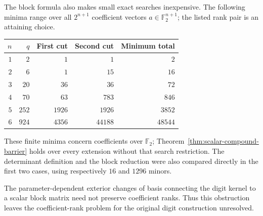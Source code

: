 The block formula also makes small exact searches inexpensive. The
following minima range over all $2^{n+1}$ coefficient vectors
$a\in\mathbb F_2^{n+1}$; the listed rank pair is an attaining choice.
\begin{center}
\begin{tabular}{@{}rrrrr@{}}
\toprule
$n$ & $q$ & First cut & Second cut & Minimum total\\
\midrule
$1$&$2$&$1$&$1$&$2$\\
$2$&$6$&$1$&$15$&$16$\\
$3$&$20$&$36$&$36$&$72$\\
$4$&$70$&$63$&$783$&$846$\\
$5$&$252$&$1926$&$1926$&$3852$\\
$6$&$924$&$4356$&$44188$&$48544$\\
\bottomrule
\end{tabular}
\end{center}
These finite minima concern coefficients over $\mathbb F_2$;
Theorem~\ref{thm:scalar-compound-barrier} holds over every extension
without that search restriction. The determinant definition and
the block reduction were also compared directly in the first two
cases, using respectively $16$ and $1296$ minors.

The parameter-dependent exterior changes of basis connecting the
digit kernel to a scalar block matrix need not preserve coefficient
ranks. Thus this obstruction leaves the coefficient-rank problem
for the original digit construction unresolved.
